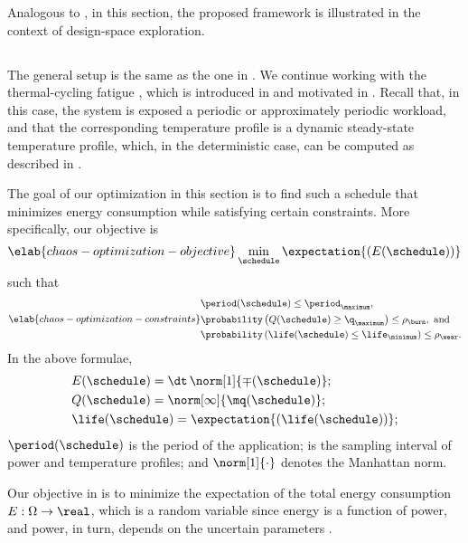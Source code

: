Analogous to , in this section, the proposed
framework is illustrated in the context of design-space exploration.

\subsection{\problemtitle}

The general setup is the same as the one in . We
continue working with the thermal-cycling fatigue \cite{jedec2016}, which is
introduced in  and motivated in
. Recall that, in this case, the system is
exposed a periodic or approximately periodic workload, and that the
corresponding temperature profile is a dynamic steady-state temperature profile,
which, in the deterministic case, can be computed as described in
.

The goal of our optimization in this section is to find such a schedule
\schedule that minimizes energy consumption while satisfying certain
constraints. More specifically, our objective is
\begin{equation} \elab{chaos-optimization-objective}
  \min_{\schedule} \expectation{(E(\schedule))}
\end{equation}
such that
\begin{equation} \elab{chaos-optimization-constraints}
  \begin{split}
    & \period(\schedule) \leq \period_\maximum, \\
    & \probability\left(Q(\schedule) \geq \q_\maximum\right) \leq \rho_\burn, \text{ and} \\
    & \probability\left(\life(\schedule) \leq \life_\minimum\right) \leq \rho_\wear.
  \end{split}
\end{equation}
In the above formulae,
\begin{align*}
  & E(\schedule) = \dt \, \norm[1]{\mp(\schedule)}; \\
  & Q(\schedule) = \norm[\infty]{\mq(\schedule)}; \\
  & \life(\schedule) = \expectation{\left(\life(\schedule)\right)};
\end{align*}
$\period(\schedule)$ is the period of the application; \dt is the sampling
interval of power and temperature profiles; and $\norm[1]{\cdot}$ denotes the
Manhattan norm.

Our objective in  is to minimize the
expectation of the total energy consumption $E: \Omega \to \real$, which is a
random variable since energy is a function of power, and power, in turn, depends
on the uncertain parameters \vu.

